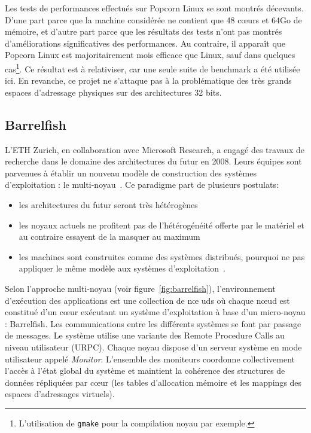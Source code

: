       Les tests de performances effectués sur Popcorn Linux se sont montrés
      décevants. D'une part parce que la machine considérée ne contient que 48
      c\oe urs et 64Go de mémoire, et d'autre part parce que les résultats des
      tests n'ont pas montrés d'améliorations significatives des
      performances. Au contraire, il apparaît que Popcorn Linux est
      majoritairement mois efficace que Linux, sauf dans quelques
      cas\footnote{L'utilisation de \texttt{gmake} pour la compilation noyau par
        exemple.}. Ce résultat est à relativiser, car une seule suite de
      benchmark a été utilisée ici. En revanche, ce projet ne s'attaque pas à la
      problématique des très grands espaces d'adressage physiques sur des
      architectures 32 bits.


    \subsection{Barrelfish}
      
      L’ETH Zurich, en collaboration avec Microsoft Research, a engagé des
      travaux de recherche dans le domaine des architectures du futur en
      2008. Leurs équipes sont parvenues à établir un nouveau modèle de
      construction des systèmes d’exploitation : le
      multi-noyau~\citep{baumann2009multikernel}. Ce paradigme part de plusieurs
      postulats:
      \begin{itemize}
        \item les architectures du futur seront très
          hétérogènes~\citep{schupbach2008embracing}
        \item les noyaux actuels ne profitent pas de l’hétérogénéité offerte par
          le matériel et au contraire essayent de la masquer au maximum
        \item les machines sont construites comme des systèmes distribués,
          pourquoi ne pas appliquer le même modèle aux systèmes
          d’exploitation~\citep{baumann2009your}.
      \end{itemize}

      Selon l’approche multi-noyau (voir figure~\ref{fig:barrelfish}),
      l'environnement d’exécution des applications est une collection de n\oe
      uds où chaque n\oe ud est constitué d’un c\oe ur exécutant un système
      d'exploitation à base d’un micro-noyau : Barrelfish. Les communications
      entre les différents systèmes se font par passage de messages. Le système
      utilise une variante des Remote Procedure Calls au niveau utilisateur
      (URPC). Chaque noyau dispose d’un serveur système en mode utilisateur
      appelé \textit{Monitor}. L’ensemble des moniteurs coordonne collectivement
      l’accès à l’état global du système et maintient la cohérence des
      structures de données répliquées par c\oe ur (les tables d’allocation
      mémoire et les mappings des espaces d’adressages virtuels).\\

